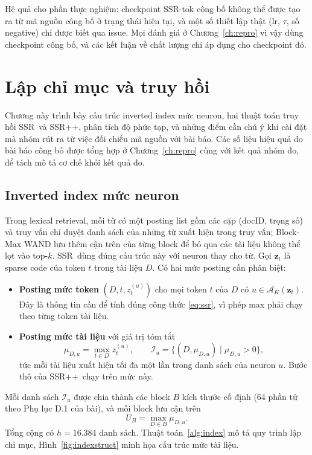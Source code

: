 \documentclass[a4paper,13pt]{extreport}
\theoremstyle{plain}
\newcommand{\ssr}{SSR}
\newcommand{\ssrpp}{SSR++}
\newcommand{\bz}{\mathbf{z}}
\newcommand{\AK}{\mathcal{A}_K}
\begin{document}
Hệ quả cho phần thực nghiệm: checkpoint \ssr-tok công bố không thể được tạo ra từ mã nguồn công bố ở trạng thái hiện tại, và một số thiết lập thật (lr, $\tau$, số negative) chỉ được biết qua issue. Mọi đánh giá ở Chương~\ref{ch:repro} vì vậy dùng checkpoint công bố, và các kết luận về chất lượng chỉ áp dụng cho checkpoint đó.
\chapter{Lập chỉ mục và truy hồi}
\label{ch:index}

Chương này trình bày cấu trúc inverted index mức neuron, hai thuật toán truy hồi \ssr\ và \ssrpp, phân tích độ phức tạp, và những điểm cần chú ý khi cài đặt mà nhóm rút ra từ việc đối chiếu mã nguồn với bài báo. Các số liệu hiệu quả do bài báo công bố được tổng hợp ở Chương~\ref{ch:repro} cùng với kết quả nhóm đo, để tách mô tả cơ chế khỏi kết quả đo.

\section{Inverted index mức neuron}
\label{sec:neuron-index}
Trong lexical retrieval, mỗi từ có một posting list gồm các cặp (docID, trọng số) và truy vấn chỉ duyệt danh sách của những từ xuất hiện trong truy vấn; Block-Max WAND lưu thêm cận trên của từng block để bỏ qua các tài liệu không thể lọt vào top-$k$. \ssr\ dùng đúng cấu trúc này với neuron thay cho từ. Gọi $\bz_t$ là sparse code của token $t$ trong tài liệu $D$. Có hai mức posting cần phân biệt:
\begin{itemize}[leftmargin=1.5cm]
  \item \textbf{Posting mức token} $(D,t,z_t^{(u)})$ cho mọi token $t$ của $D$ có $u\in\AK(\bz_t)$. Đây là thông tin cần để tính đúng công thức \eqref{eq:ssr}, vì phép max phải chạy theo từng token tài liệu.
  \item \textbf{Posting mức tài liệu} với giá trị tóm tắt
  \begin{equation}
  \mu_{D,u}=\max_{t\in D} z_t^{(u)},\qquad
  \mathcal{I}_u=\{(D,\mu_{D,u})\mid \mu_{D,u}>0\},
  \label{eq:mu}
  \end{equation}
  tức mỗi tài liệu xuất hiện tối đa một lần trong danh sách của neuron $u$. Bước thô của \ssrpp\ chạy trên mức này.
\end{itemize}
Mỗi danh sách $\mathcal{I}_u$ được chia thành các block $B$ kích thước cố định (64 phần tử theo Phụ lục D.1 của bài), và mỗi block lưu cận trên
\begin{equation}
U_B=\max_{D\in B}\mu_{D,u} .
\label{eq:ub}
\end{equation}
Tổng cộng có $h=16.384$ danh sách. Thuật toán~\ref{alg:index} mô tả quy trình lập chỉ mục, Hình~\ref{fig:indexstruct} minh họa cấu trúc mức tài liệu.
\end{document}
